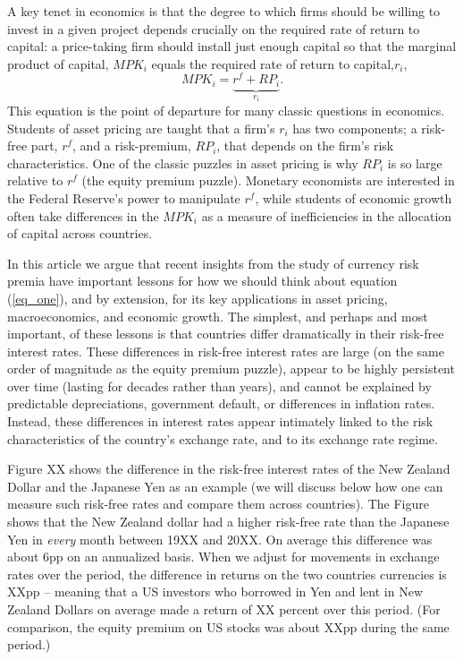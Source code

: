 \documentclass[12pt,letter]{article}
\theoremstyle{break} \theorembodyfont{\normalfont\itshape}
\theoremstyle{break}
\theoremstyle{break} \theorembodyfont{\normalfont\itshape}
\theoremstyle{break} \theorembodyfont{\normalfont\itshape}
\begin{document}
A key tenet in economics is that the degree to which firms should be willing to invest in a given project depends crucially on the required rate of return to capital: a price-taking firm should install just enough capital so that the marginal product of capital, $MPK_i$ equals the required rate of return to capital,$r_i$, \begin{equation}MPK_i=\underbrace{r^f+RP_i}_{ r_i}.\label{eq_one}\end{equation} 
This equation is the point of departure for many classic questions in economics. Students of asset pricing are taught that a firm's $r_i$ has two components; a risk-free part, $r^f$, and a risk-premium, $RP_i$, that depends on the firm's risk characteristics. One of the classic puzzles in asset pricing is why $RP_i$ is so large relative to $r^f$ (the equity premium puzzle). Monetary economists are interested in the Federal Reserve's power to manipulate $r^f$, while students of economic growth often take differences in the $MPK_i$ as a measure of inefficiencies in the allocation of capital across countries.

In this article we argue that recent insights from the study of currency risk premia have important lessons for how we should think about equation (\ref{eq_one}), and by extension, for its key applications in asset pricing, macroeconomics, and economic growth. The simplest, and perhaps and most important, of these lessons is that countries differ dramatically in their risk-free interest rates. These differences in risk-free interest rates are large (on the same order of magnitude as the equity premium puzzle), appear to be highly persistent over time (lasting for decades rather than years), and cannot be explained by predictable depreciations, government default, or differences in inflation rates. Instead, these differences in interest rates appear intimately linked to the risk characteristics of the country's exchange rate, and to its exchange rate regime.   

Figure XX shows the difference in the risk-free interest rates of the New Zealand Dollar and the Japanese Yen as an example (we will discuss below how one can measure such risk-free rates and compare them across countries). The Figure shows that the New Zealand dollar had a higher risk-free rate than the Japanese Yen in \textit{every} month between 19XX and 20XX. On average this difference was about 6pp on an annualized basis. When we adjust for movements in exchange rates over the period, the difference in returns on the two countries currencies is XXpp --  meaning that a US investors who borrowed in Yen and lent in New Zealand Dollars on average made a return of XX percent over this period. (For comparison, the equity premium on US stocks was about XXpp during the same period.)
\end{document}
